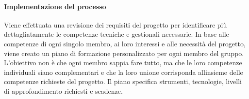\documentclass[12pt, a4paper]{article}
\begin{document}
\paragraph{Implementazione del processo}

Viene effettuata una revisione dei requisiti del progetto per
identificare più dettagliatamente le competenze tecniche e gestionali
necessarie. In base alle competenze di ogni singolo membro, ai loro
interessi e alle necessità del progetto, viene creato un piano di
formazione personalizzato per ogni membro del gruppo. L'obiettivo non è
che ogni membro sappia fare tutto, ma che le loro competenze individuali
siano complementari e che la loro unione corrisponda
all\textquotesingle insieme delle competenze richieste del progetto. Il
piano specifica strumenti, tecnologie, livelli di approfondimento
richiesti e scadenze.
\end{document}
